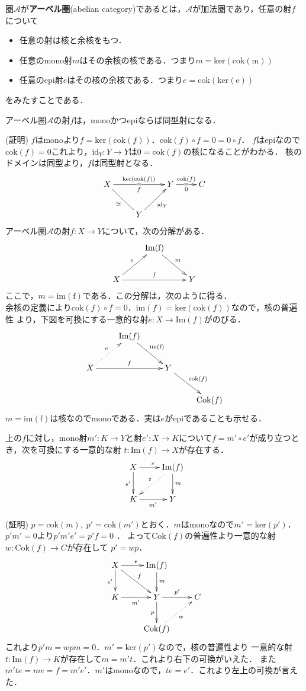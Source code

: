 \begin{defi}
圏$\mathcal{A}$が{\bf アーベル圏}(abelian category)であるとは，$\mathcal{A}$が加法圏であり，任意の射$f$について
\begin{itemize}
\item 任意の射は核と余核をもつ．
\item 任意のmono射$m$はその余核の核である．つまり$m = \mathrm{ker}(\mathrm{cok(m)})$
\item 任意のepi射$e$はその核の余核である．つまり$e = \mathrm{cok}(\mathrm{ker(e)})$
\end{itemize}
をみたすことである．

\end{defi} \proofend

\begin{prop}
アーベル圏$\mathcal{A}$の射$f$は，monoかつepiならば同型射になる．
\end{prop}
(証明) $f$はmonoより$ f = \mathrm{ker}(\mathrm{cok}(f))$．$\mathrm{cok}(f) \circ f = 0 = 0 \circ f$．
$f$はepiなので$\mathrm{cok}(f) = 0$これより，$\mathrm{id}_Y:Y \to Y$は$0 = \mathrm{cok}(f)$の核になることがわかる．
核のドメインは同型より，$f$は同型射となる．
\[
\xymatrix{
X \ar[rr]^{\mathrm{ker}(\mathrm{cok}(f))}_{f} | = && Y\ar[r]_{0}^{\mathrm{cok}(f)} | = & C  \\
&Y \ar@{-}[ul]^{\cong} \ar[ur]_{\mathrm{id}_Y}
}
\]
\proofend
アーベル圏$\mathcal{A}$の射$f : X \to Y$について，次の分解がある．
\[
\xymatrix{
&\mathrm{Im(f)} \ar[rd]^m  \\
X\ar[ru]^e \ar[rr]^f  && Y
}
\]
ここで，$m=\mathrm{im(f)}$である．この分解は，次のように得る．\\
余核の定義により$\mathrm{cok}(f) \circ f = 0$．$\mathrm{im}(f) = \mathrm{ker}(\mathrm{cok}(f))$なので，核の普遍性
より，下図を可換にする一意的な射$e: X \to \mathrm{Im}(f)$がのびる．
\[
\xymatrix{
&\mathrm{Im}(f) \ar[rd]^{\mathrm{im(f)}} \\
X\ar@{.>}[ru]^e \ar[rr]^f  && Y \ar[rd]^{\mathrm{cok}(f)} \\
&&& \mathrm{Cok}(f)
}
\]
$m=\mathrm{im(f)}$は核なのでmonoである．実は$e$がepiであることも示せる．
\begin{lem}
上の$f$に対し，mono射$m': K \to Y$と射$e': X \to K$について$f=m' \circ e'$が成り立つとき，次を可換にする一意的な射
$t :\mathrm{Im}(f) \to X$が存在する．
\[
\xymatrix{
X \ar[d]_{e'} \ar[r]^{e} & \mathrm{Im}(f) \ar[d]^m  \ar@{.>}[ld]_t\\
K \ar[r]_{m'} & Y
}
\]
\end{lem}
(証明) 
$p = \mathrm{cok}(m) ,\;p' = \mathrm{cok}(m')$とおく．$m$はmonoなので$m' = \mathrm{ker}(p')$．
$p'  m' = 0$より$p'  m'  e' = p'  f = 0$ ．
よって$\mathrm{Cok}(f)$の普遍性より一意的な射$w : \mathrm{Cok}(f) \to C$が存在して
$p' = w p$．
\[
\xymatrix{
X \ar[d]_{e'} \ar[r]^e \ar[rd]^f 	& \mathrm{Im}(f)  \ar[d]^m  \\
K \ar[r]_{m'} 				& Y \ar[r]^{p'} \ar[d]_{p} &	C \\
						& \mathrm{Cok}(f) \ar@{.>}[ru]_w
}
\]
これより$p'  m = w  p  m = 0$．$m' = \mathrm{ker}(p')$なので，核の普遍性より
一意的な射$t:\mathrm{Im}(f) \to K$が存在して$m = m't$．これより右下の可換がいえた．
また$m'te = me = f = m'e'$．$m'$はmonoなので，$te = e'$．これより左上の可換が言えた．
\proofend

